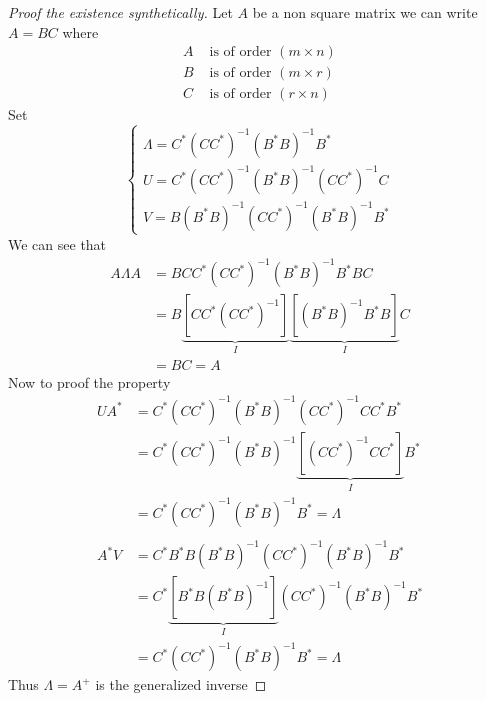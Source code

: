 \begin{proof}[\textcolor{theme}{Proof the existence synthetically}]
Let $A$ be a non square matrix we can write $A = BC$ where
        \begin{align*}
                A &\text{ is of order } (m\times n)
                \\
                B &\text{ is of order } (m\times r)
                \\
                C &\text{ is of order } (r\times n)
        \end{align*}
Set
        \begin{equation*}
                \begin{cases}
                        \displaystyle \Lambda = C^{*}(CC^{*})^{-1}(B^{*}B)^{-1}B^{*}
                        \\
                        \displaystyle U = C^{*}(CC^{*})^{-1}(B^{*}B)^{-1}(CC^{*})^{-1}C
                        \\
                        \displaystyle V = B(B^{*}B)^{-1}(CC^{*})^{-1}(B^{*}B)^{-1}B^{*}
                    \end{cases}
        \end{equation*}
We can see that 
        \begin{align*}
                A\Lambda A &= BCC^{*}(CC^{*})^{-1}(B^{*}B)^{-1}B^{*}BC
                \\
                &= B\underbrace{\left[CC^{*}(CC^{*})^{-1}\right]}_{I}\underbrace{\left[(B^{*}B)^{-1}B^{*}B\right]}_{I}C
                \\
                &= BC = A
        \end{align*}
Now to proof the property 
\begin{align*}
        UA^* &=  C^{*}(CC^{*})^{-1}(B^{*}B)^{-1}(CC^{*})^{-1}C C^* B^*
        \\
        &=  C^{*}(CC^{*})^{-1}(B^{*}B)^{-1}\underbrace{\left[(CC^{*})^{-1}C C^*\right]}_{I} B^*
        \\
        &= C^{*}(CC^{*})^{-1}(B^{*}B)^{-1}B^* = \Lambda
        \\
        \\
        A^*V &=  C^* B^*B(B^{*}B)^{-1}(CC^{*})^{-1}(B^{*}B)^{-1}B^{*}
        \\
        &=  C^{*}\underbrace{\left[B^*B(B^{*}B)^{-1}\right]}_{I}(CC^{*})^{-1}(B^{*}B)^{-1}B^{*}
        \\
        &= C^{*}(CC^{*})^{-1}(B^{*}B)^{-1}B^* = \Lambda
\end{align*}
Thus $\Lambda = A^{+} $ is the generalized inverse
\end{proof}

